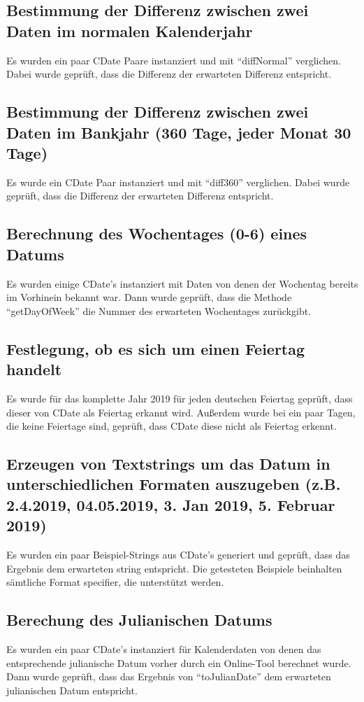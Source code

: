 \documentclass[12pt,pdftex,parskip=half]{scrartcl}
\begin{document}
  \subsection{Bestimmung der Differenz zwischen zwei Daten im normalen Kalenderjahr}
  Es wurden ein paar CDate Paare instanziert und mit "`diffNormal"' verglichen. Dabei wurde geprüft, dass die Differenz der erwarteten Differenz entspricht.

  \subsection{Bestimmung der Differenz zwischen zwei Daten im Bankjahr (360 Tage, jeder Monat 30 Tage)}
  Es wurde ein CDate Paar instanziert und mit "`diff360"' verglichen. Dabei wurde geprüft, dass die Differenz der erwarteten Differenz entspricht.

  \subsection{Berechnung des Wochentages (0-6) eines Datums}
  Es wurden einige CDate's instanziert mit Daten von denen der Wochentag bereits im Vorhinein bekannt war. Dann wurde geprüft, dass die Methode "`getDayOfWeek"' die Nummer des erwarteten Wochentages zurückgibt.

  \subsection{Festlegung, ob es sich um einen Feiertag handelt}
  Es wurde für das komplette Jahr 2019 für jeden deutschen Feiertag geprüft, dass dieser von CDate als Feiertag erkannt wird.
  Außerdem wurde bei ein paar Tagen, die keine Feiertage sind, geprüft, dass CDate diese nicht als Feiertag erkennt.

  \subsection{Erzeugen von Textstrings um das Datum in unterschiedlichen Formaten auszugeben (z.B. 2.4.2019, 04.05.2019, 3. Jan 2019, 5. Februar 2019)}
  Es wurden ein paar Beispiel-Strings aus CDate's generiert und geprüft, dass das Ergebnis dem erwarteten string entspricht.
  Die getesteten  Beispiele beinhalten sämtliche Format specifier, die unterstützt werden.


  \subsection{Berechung des Julianischen Datums}
  Es wurden ein paar CDate's instanziert für Kalenderdaten von denen das entsprechende julianische Datum vorher durch ein Online-Tool berechnet wurde. Dann wurde geprüft, dass das Ergebnis von "`toJulianDate"' dem erwarteten julianischen Datum entspricht.
\end{document}
